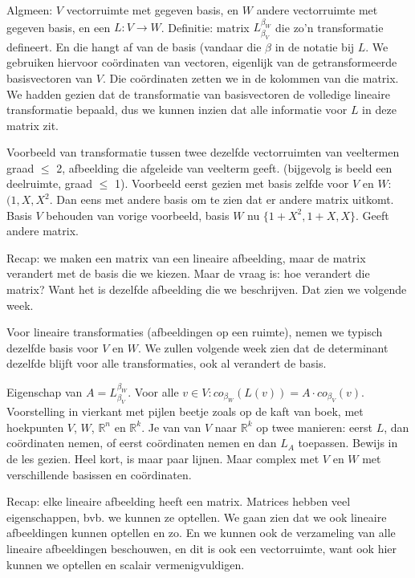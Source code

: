 \documentclass{article}
\begin{document}
Algmeen: $V$ vectorruimte met gegeven basis, en $W$ andere vectorruimte met gegeven basis, en een $L: V \to W$. Definitie: matrix $L_{\beta_V}^{\beta_W}$ die zo'n transformatie defineert. En die hangt af van de basis (vandaar die $\beta$ in de notatie bij $L$.  
We gebruiken hiervoor co\"ordinaten van vectoren, eigenlijk van de getransformeerde basisvectoren van $V$. Die co\"ordinaten zetten we in de kolommen van die matrix. We hadden gezien dat de transformatie van basisvectoren de volledige lineaire transformatie bepaald, dus we kunnen inzien dat alle informatie voor $L$ in deze matrix zit. 

Voorbeeld van transformatie tussen twee dezelfde vectorruimten van veeltermen graad $\leq$ 2, afbeelding die afgeleide van veelterm geeft. (bijgevolg is beeld een deelruimte, graad $\leq$ 1). Voorbeeld eerst gezien met basis zelfde voor $V$ en $W$:  $(1,X,X^2$. Dan eens met andere basis om te zien dat er andere matrix uitkomt. Basis $V$ behouden van vorige voorbeeld, basis $W$ nu $\{ 1+X^2, 1+X, X \}$. Geeft andere matrix. 

Recap: we maken een matrix van een lineaire afbeelding, maar de matrix verandert met de basis die we kiezen. Maar de vraag is: hoe verandert die matrix? Want het is dezelfde afbeelding die we beschrijven. Dat zien we volgende week. 

Voor lineaire transformaties (afbeeldingen op een ruimte), nemen we typisch dezelfde basis voor $V$ en $W$. We zullen volgende week zien dat de determinant dezelfde blijft voor alle transformaties, ook al verandert de basis. 

Eigenschap van $A = L_{\beta_V}^{\beta_W}$. Voor alle $v \in V: co_{\beta_W}(L(v)) = A \cdot co_{\beta_V}(v)$. Voorstelling in vierkant met pijlen beetje zoals op de kaft van boek, met hoekpunten $V$, $W$, $\mathbb{R}^n$ en $\mathbb{R}^k$. Je van van $V$ naar $\mathbb{R}^k$ op twee manieren: eerst $L$, dan co\"ordinaten nemen, of eerst co\"ordinaten nemen en dan $L_A$ toepassen. 
Bewijs in de les gezien. Heel kort, is maar paar lijnen. Maar complex met $V$ en $W$ met verschillende basissen en co\"ordinaten. 

Recap: 
elke lineaire afbeelding heeft een matrix. Matrices hebben veel eigenschappen, bvb. we kunnen ze optellen. We gaan zien dat we ook lineaire afbeeldingen kunnen optellen en zo. En we kunnen ook de verzameling van alle lineaire afbeeldingen beschouwen, en dit is ook een vectorruimte, want ook hier kunnen we optellen en scalair vermenigvuldigen. 
\end{document}
